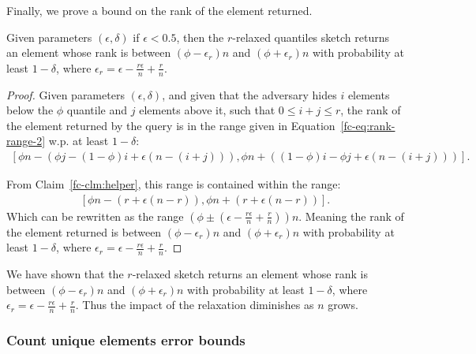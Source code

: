 Finally, we prove a bound on the rank of the element returned. 
\begin{lemma}
    Given parameters $(\epsilon,\delta)$ if $\epsilon<0.5$, then the $r$-relaxed
    quantiles sketch returns an element whose rank is
    between $(\phi-\epsilon_r)n$ and $(\phi+\epsilon_r)n$ with probability at
    least $1-\delta$, where $\epsilon_r=\epsilon - \frac{r \epsilon}{n} + \frac{r}{n}$.
    \label{fc-lemma:quantiles-weak-adversary}
\end{lemma}
\begin{proof}
    Given parameters $(\epsilon,\delta)$, and given that the adversary hides $i$ elements below the
    $\phi$ quantile and $j$ elements above it, such that $0\leq i+j\leq r$, the rank of the element returned
    by the query is in the range given in Equation~\ref{fc-eq:rank-range-2} w.p. at least $1-\delta$:
    \begin{align*}
        \left[\phi n - (\phi j - (1-\phi)i+\epsilon(n-(i+j))), \phi n + ((1-\phi)i - \phi j +\epsilon(n-(i+j))) \right].
    \end{align*}

    From Claim~\ref{fc-clm:helper}, this range is contained within the range:
    \begin{align*}
        \left[\phi n - (r + \epsilon(n-r)), \phi n + (r + \epsilon(n-r)) \right].
    \end{align*}
    Which can be rewritten as the range $\left(\phi \pm \left(\epsilon - \frac{r \epsilon}{n} + \frac{r}{n}\right)\right)n$.
    Meaning the rank of the element returned is between $(\phi-\epsilon_r)n$ and $(\phi+\epsilon_r)n$ with probability at
    least $1-\delta$, where $\epsilon_r=\epsilon - \frac{r \epsilon}{n} + \frac{r}{n}$.
\end{proof}

We have shown that the $r$-relaxed sketch returns an element whose rank is
between $(\phi-\epsilon_r)n$ and $(\phi+\epsilon_r)n$ with probability at
least $1-\delta$, where $\epsilon_r=\epsilon - \frac{r \epsilon}{n} + \frac{r}{n}$. Thus
the impact of the relaxation diminishes as $n$ grows.

\subsubsection{Count unique elements error bounds}
\label{fc-ssec:pac-unique}

